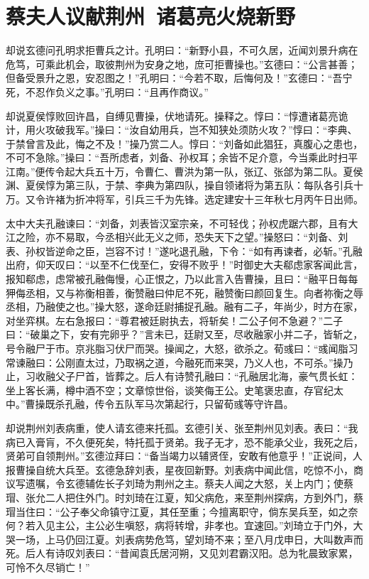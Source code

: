 \chapter{蔡夫人议献荆州~诸葛亮火烧新野}

却说玄德问孔明求拒曹兵之计。孔明曰：“新野小县，不可久居，近闻刘景升病在危笃，可乘此机会，取彼荆州为安身之地，庶可拒曹操也。”玄德曰：“公言甚善；但备受景升之恩，安忍图之！”孔明曰：“今若不取，后悔何及！”玄德曰：“吾宁死，不忍作负义之事。”孔明曰：“且再作商议。”

却说夏侯惇败回许昌，自缚见曹操，伏地请死。操释之。惇曰：“惇遭诸葛亮诡计，用火攻破我军。”操曰：“汝自幼用兵，岂不知狭处须防火攻？”惇曰：“李典、于禁曾言及此，悔之不及！”操乃赏二人。惇曰：“刘备如此猖狂，真腹心之患也，不可不急除。”操曰：“吾所虑者，刘备、孙权耳；余皆不足介意，今当乘此时扫平江南。”便传令起大兵五十万，令曹仁、曹洪为第一队，张辽、张郃为第二队。夏侯渊、夏侯惇为第三队，于禁、李典为第四队，操自领诸将为第五队：每队各引兵十万。又令许褚为折冲将军，引兵三千为先锋。选定建安十三年秋七月丙午日出师。

太中大夫孔融谏曰：“刘备，刘表皆汉室宗亲，不可轻伐；孙权虎踞六郡，且有大江之险，亦不易取，今丞相兴此无义之师，恐失天下之望。”操怒曰：“刘备、刘表、孙权皆逆命之臣，岂容不讨！”遂叱退孔融，下令：“如有再谏者，必斩。”孔融出府，仰天叹曰：“以至不仁伐至仁，安得不败乎！”时御史大夫郗虑家客闻此言，报知郗虑，虑常被孔融侮慢，心正恨之，乃以此言入告曹操，且曰：“融平日每每狎侮丞相，又与祢衡相善，衡赞融曰仲尼不死，融赞衡曰颜回复生。向者祢衡之辱丞相，乃融使之也。”操大怒，遂命廷尉捕捉孔融。融有二子，年尚少，时方在家，对坐弈棋。左右急报曰：“尊君被廷尉执去，将斩矣！二公子何不急避？”二子曰：“破巢之下，安有完卵乎？”言未已，廷尉又至，尽收融家小并二子，皆斩之，号令融尸于市。京兆脂习伏尸而哭。操闻之，大怒，欲杀之。荀彧曰：“彧闻脂习常谏融曰：公刚直太过，乃取祸之道，今融死而来哭，乃义人也，不可杀。”操乃止，习收融父子尸首，皆葬之。后人有诗赞孔融曰：“孔融居北海，豪气贯长虹：坐上客长满，樽中酒不空；文章惊世俗，谈笑侮王公。史笔褒忠直，存官纪太中。”曹操既杀孔融，传令五队军马次第起行，只留荀彧等守许昌。

却说荆州刘表病重，使人请玄德来托孤。玄德引关、张至荆州见刘表。表曰：“我病已入膏肓，不久便死矣，特托孤于贤弟。我子无才，恐不能承父业，我死之后，贤弟可自领荆州。”玄德泣拜曰：“备当竭力以辅贤侄，安敢有他意乎！”正说间，人报曹操自统大兵至。玄德急辞刘表，星夜回新野。刘表病中闻此信，吃惊不小，商议写遗嘱，令玄德辅佐长子刘琦为荆州之主。蔡夫人闻之大怒，关上内门；使蔡瑁、张允二人把住外门。时刘琦在江夏，知父病危，来至荆州探病，方到外门，蔡瑁当住曰：“公子奉父命镇守江夏，其任至重；今擅离职守，倘东吴兵至，如之奈何？若入见主公，主公必生嗔怒，病将转增，非孝也。宜速回。”刘琦立于门外，大哭一场，上马仍回江夏。刘表病势危笃，望刘琦不来；至八月戊申日，大叫数声而死。后人有诗叹刘表曰：“昔闻袁氏居河朔，又见刘君霸汉阳。总为牝晨致家累，可怜不久尽销亡！”

